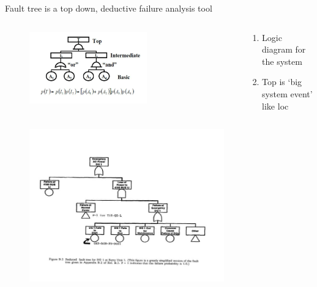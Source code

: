 \documentclass[aspectratio=1610,pdftex,dvipsnames,compress,xcolor={dvipsnames}]{beamer}
\newcommand{\acf}{\acrfull} %
\begin{document}
\addtocounter{framenumber}{-1}
\begin{frame}{Fault tree is a top down, deductive failure analysis tool}
    \begin{columns}[c]

        \begin{column}{0.65\textwidth}
            \begin{figure}
                \centering
                \includegraphics[width=0.65\textwidth]{fault.tree.jpg}
            \end{figure}
        \end{column}

        \begin{column}{0.35\textwidth}
            \begin{enumerate}[series=outerlist,topsep=0pt,itemsep=21pt,leftmargin=*,label=(\arabic*)]
                \item[]Logic diagram for the system
                \item[]Top is `big system event' like \acf{loc}
            \end{enumerate}
        \end{column}

    \end{columns}
\end{frame}


\begin{frame}{}
    \begin{figure}
        \centering
        \includegraphics[width=0.75\textwidth]{fault.tree.wash.jpg}
    \end{figure}
\end{frame}
\end{document}
